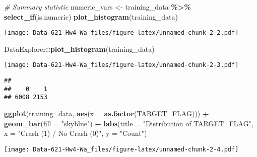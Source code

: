 \documentclass[
]{article}
\newenvironment{Shaded}{\begin{snugshade}}{\end{snugshade}}
\newcommand{\AttributeTok}[1]{\textcolor[rgb]{0.13,0.29,0.53}{#1}}
\newcommand{\CommentTok}[1]{\textcolor[rgb]{0.56,0.35,0.01}{\textit{#1}}}
\newcommand{\FunctionTok}[1]{\textcolor[rgb]{0.13,0.29,0.53}{\textbf{#1}}}
\newcommand{\NormalTok}[1]{#1}
\newcommand{\OtherTok}[1]{\textcolor[rgb]{0.56,0.35,0.01}{#1}}
\newcommand{\SpecialCharTok}[1]{\textcolor[rgb]{0.81,0.36,0.00}{\textbf{#1}}}
\newcommand{\StringTok}[1]{\textcolor[rgb]{0.31,0.60,0.02}{#1}}
\begin{document}
\begin{Shaded}
\begin{Highlighting}[]
\CommentTok{\# Summary statistic }
\NormalTok{numeric\_vars }\OtherTok{\textless{}{-}}\NormalTok{ training\_data }\SpecialCharTok{\%\textgreater{}\%} \FunctionTok{select\_if}\NormalTok{(is.numeric)}
\FunctionTok{plot\_histogram}\NormalTok{(training\_data)}
\end{Highlighting}
\end{Shaded}

\texttt{[image: Data-621-Hw4-Wa\_files/figure-latex/unnamed-chunk-2-2.pdf]}

\begin{Shaded}
\begin{Highlighting}[]
\NormalTok{DataExplorer}\SpecialCharTok{::}\FunctionTok{plot\_histogram}\NormalTok{(training\_data)}
\end{Highlighting}
\end{Shaded}

\texttt{[image: Data-621-Hw4-Wa\_files/figure-latex/unnamed-chunk-2-3.pdf]}

\begin{Shaded}
\end{Shaded}

\begin{verbatim}
## 
##    0    1 
## 6008 2153
\end{verbatim}

\begin{Shaded}
\begin{Highlighting}[]
\FunctionTok{ggplot}\NormalTok{(training\_data, }\FunctionTok{aes}\NormalTok{(}\AttributeTok{x =} \FunctionTok{as.factor}\NormalTok{(TARGET\_FLAG))) }\SpecialCharTok{+}
  \FunctionTok{geom\_bar}\NormalTok{(}\AttributeTok{fill =} \StringTok{"skyblue"}\NormalTok{) }\SpecialCharTok{+}
  \FunctionTok{labs}\NormalTok{(}\AttributeTok{title =} \StringTok{"Distribution of TARGET\_FLAG"}\NormalTok{, }\AttributeTok{x =} \StringTok{"Crash (1) / No Crash (0)"}\NormalTok{, }\AttributeTok{y =} \StringTok{"Count"}\NormalTok{)}
\end{Highlighting}
\end{Shaded}

\texttt{[image: Data-621-Hw4-Wa\_files/figure-latex/unnamed-chunk-2-4.pdf]}
\end{document}

